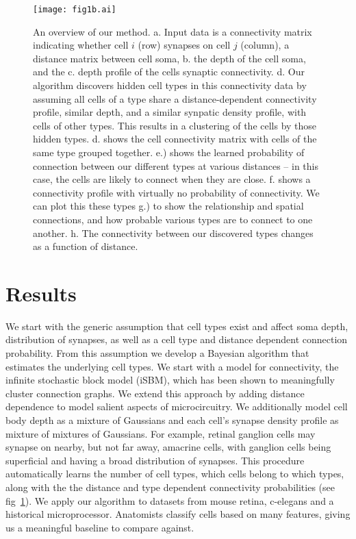 \documentclass{nature}
\begin{document}
\begin{figure}
  \centering 
  \centerline{\texttt{[image: fig1b.ai]}}
  \caption{An overview of our method. a. Input data is a connectivity
    matrix indicating whether cell $i$ (row) synapses on cell $j$
    (column), a distance matrix between cell soma, b. the depth of the
    cell soma, and the c. depth profile of the cells synaptic
    connectivity. d. Our algorithm discovers hidden cell types in this
    connectivity data by assuming all cells of a type share a
    distance-dependent connectivity profile, similar depth, and a
    similar synpatic density profile, with cells of other types.  This
    results in a clustering of the cells by those hidden
    types. d. shows the cell connectivity matrix with cells of the
    same type grouped together. e.) shows the learned probability of
    connection between our different types at various distances -- in
    this case, the cells are likely to connect when they are
    close. f. shows a connectivity profile with virtually no
    probability of connectivity. We can plot this these types g.) to
    show the relationship and spatial connections, and how probable
    various types are to connect to one another. h. The connectivity
    between our discovered types changes as a function of distance. }

\label{fig:overview}
\end{figure}

\section{Results}
We start with the generic assumption that cell types exist and affect
soma depth, distribution of synapses, as well as a cell type and
distance dependent connection probability. From this assumption we
develop a Bayesian algorithm that estimates the underlying cell types.
We start with a model for connectivity, the infinite stochastic block
model (iSBM)\autocite{Kemp2006a,Xu2006}, which has been shown to
meaningfully cluster connection graphs. We extend this approach by
adding distance dependence to model salient aspects of
microcircuitry. We additionally model cell body depth as a mixture of
Gaussians and each cell’s synapse density profile as mixture of
mixtures of Gaussians. For example, retinal ganglion cells may synapse
on nearby, but not far away, amacrine cells, with ganglion cells being
superficial and having a broad distribution of synapses.  This
procedure automatically learns the number of cell types, which cells
belong to which types, along with the the distance and type dependent
connectivity probabilities (see fig~\ref{fig:overview}). We apply our
algorithm to datasets from mouse retina, c-elegans and a historical
microprocessor. Anatomists classify cells based on many features,
giving us a meaningful baseline to compare against.
\end{document}
